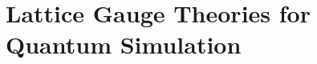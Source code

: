 \chapter{Lattice Gauge Theories for Quantum Simulation}
\label{chap:lattice_gauge_theories_for_quantum_simulation}







